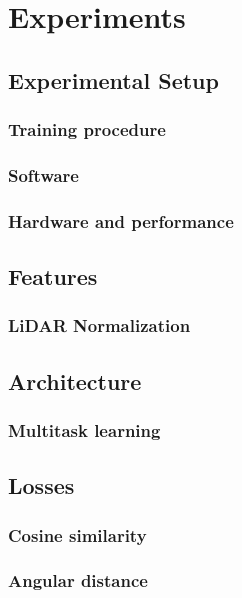 \chapter{Experiments}%
\label{sec:experiments}

\section{Experimental Setup}
\subsection{Training procedure}
\subsection{Software}
\subsection{Hardware and performance}

\section{Features}


\subsection{LiDAR Normalization}%
\label{sec:normalization-experiment}


\section{Architecture}
\subsection{Multitask learning}


\section{Losses}
\subsection{Cosine similarity}
\subsection{Angular distance}
